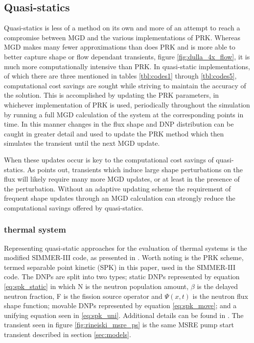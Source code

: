 \documentclass[review]{elsarticle}
\begin{document}
\subsection{Quasi-statics} \label{ssec:qs}
Quasi-statics is less of a method on its own and more of an attempt to
reach a compromise between MGD and the various implementations of PRK. Whereas
MGD makes many fewer approximations than does PRK and is more able to better
capture shape or flow dependant transients, figure \ref{fig:dulla_4x_flow},
it is much more computationally intensive than PRK. In quasi-static
implementations, of which there are three mentioned in tables \ref{tbl:codes1}
through \ref{tbl:codes5},
computational cost savings are sought while striving to maintain the accuracy
of the solution. This is accomplished by updating the PRK parameters, in
whichever implementation of PRK is used, periodically throughout the simulation
by running a full MGD calculation of the system at the corresponding points
in time. In this manner changes in the flux shape and DNP distribution can
be caught in greater detail and used to update the PRK method which then 
simulates the transient until the next MGD update.
\par When these updates occur is key to the computational cost savings of
quasi-statics. As \cite{dulla_models_2005} points out, transients which induce
large shape perturbations on the flux will likely require many more MGD
updates, or at least in the presence of the perturbation. Without an adaptive
updating scheme the requirement of frequent shape updates through an MGD
calculation can strongly reduce the computational savings offered by
quasi-statics.

\subsubsection{thermal system} \label{sssec:qs_therm}
Representing quasi-static approaches for the evaluation of thermal systems
is the modified SIMMER-III code, as presented in \cite{rineiski_kinetics_2005}.
Worth noting is the PRK scheme, termed separable point kinetic (SPK) in this
paper, used in the SIMMER-III code. The DNPs are split into two types;
static DNPs represented by equation \ref{eq:spk_static} in which N is the
neutron
population amount, $\beta$ is the delayed neutron fraction, F is the fission
source operator and $\Psi(x,t)$ is the neutron flux shape function;
 movable DNPs represented by
equation \ref{eq:spk_move}; and a unifying equation seen in \ref{eq:spk_uni}.
Additional details can be found in \cite{rineiski_kinetics_2005}. The transient
seen in figure \ref{fig:rineiski_msre_ps} is the same MSRE pump start transient
described in section \ref{sec:models}.
\end{document}
